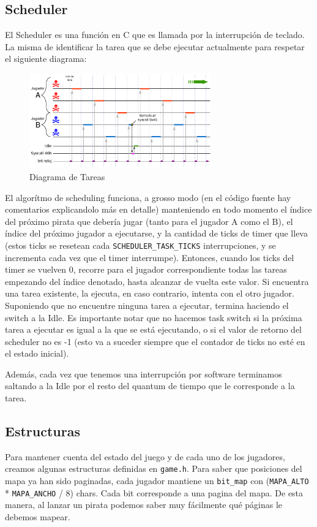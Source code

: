 \subsection{Scheduler}

El Scheduler es una función en C que es llamada por la interrupción de teclado. La misma de identificar la tarea que se debe ejecutar actualmente para respetar el siguiente diagrama:

\begin{figure}[H]
  \centering
    \includegraphics[width=0.7\textwidth]{images/scheduler}
  \caption{Diagrama de Tareas}
\end{figure}

El algorítmo de scheduling funciona, a grosso modo (en el código fuente hay comentarios explicandolo más en detalle) manteniendo en todo momento el índice del próximo pirata que debería jugar (tanto para el jugador A como el B), el índice del próximo jugador a ejecutarse, y la cantidad de ticks de timer que lleva (estos ticks se resetean cada \texttt{SCHEDULER\_TASK\_TICKS} interrupciones, y se incrementa cada vez que el timer interrumpe). Entonces, cuando los ticks del timer se vuelven 0, recorre para el jugador correspondiente todas las tareas empezando del índice denotado, hasta alcanzar de vuelta este valor. Si encuentra una tarea existente, la ejecuta, en caso contrario, intenta con el otro jugador. Suponiendo que no encuentre ninguna tarea a ejecutar, termina haciendo el switch a la Idle. Es importante notar que no hacemos task switch si la próxima tarea a ejecutar es igual a la que se está ejecutando, o si el valor de retorno del scheduler no es -1 (esto va a suceder siempre que el contador de ticks no esté en el estado inicial).

Además, cada vez que tenemos una interrupción por software terminamos saltando a la Idle por el resto del quantum de tiempo que le corresponde a la tarea.

\subsection{Estructuras}

Para mantener cuenta del estado del juego y de cada uno de los jugadores, creamos algunas estructuras definidas en \texttt{game.h}. Para saber que posiciones del mapa ya han sido paginadas, cada jugador mantiene un \texttt{bit\_map} con (\texttt{MAPA\_ALTO} * \texttt{MAPA\_ANCHO} / 8) chars. Cada bit corresponde a una pagina del mapa. De esta manera, al lanzar un pirata podemos saber muy fácilmente qué páginas le debemos mapear.

